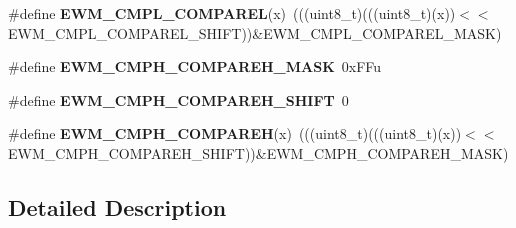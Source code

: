 \begin{DoxyCompactItemize}
\item 
\#define {\bfseries E\+W\+M\+\_\+\+C\+M\+P\+L\+\_\+\+C\+O\+M\+P\+A\+R\+EL}(x)~(((uint8\+\_\+t)(((uint8\+\_\+t)(x))$<$$<$E\+W\+M\+\_\+\+C\+M\+P\+L\+\_\+\+C\+O\+M\+P\+A\+R\+E\+L\+\_\+\+S\+H\+I\+FT))\&E\+W\+M\+\_\+\+C\+M\+P\+L\+\_\+\+C\+O\+M\+P\+A\+R\+E\+L\+\_\+\+M\+A\+SK)\hypertarget{group__EWM__Register__Masks_gab21f922dd31c0389d2431b0bad15c34a}{}\label{group__EWM__Register__Masks_gab21f922dd31c0389d2431b0bad15c34a}

\item 
\#define {\bfseries E\+W\+M\+\_\+\+C\+M\+P\+H\+\_\+\+C\+O\+M\+P\+A\+R\+E\+H\+\_\+\+M\+A\+SK}~0x\+F\+Fu\hypertarget{group__EWM__Register__Masks_ga2bba159a8c0eaace911da192c1747c73}{}\label{group__EWM__Register__Masks_ga2bba159a8c0eaace911da192c1747c73}

\item 
\#define {\bfseries E\+W\+M\+\_\+\+C\+M\+P\+H\+\_\+\+C\+O\+M\+P\+A\+R\+E\+H\+\_\+\+S\+H\+I\+FT}~0\hypertarget{group__EWM__Register__Masks_ga02d5e37ee2e38be4d3654c4eb0854cb5}{}\label{group__EWM__Register__Masks_ga02d5e37ee2e38be4d3654c4eb0854cb5}

\item 
\#define {\bfseries E\+W\+M\+\_\+\+C\+M\+P\+H\+\_\+\+C\+O\+M\+P\+A\+R\+EH}(x)~(((uint8\+\_\+t)(((uint8\+\_\+t)(x))$<$$<$E\+W\+M\+\_\+\+C\+M\+P\+H\+\_\+\+C\+O\+M\+P\+A\+R\+E\+H\+\_\+\+S\+H\+I\+FT))\&E\+W\+M\+\_\+\+C\+M\+P\+H\+\_\+\+C\+O\+M\+P\+A\+R\+E\+H\+\_\+\+M\+A\+SK)\hypertarget{group__EWM__Register__Masks_gae012c25873f36888e3d0302060c97be5}{}\label{group__EWM__Register__Masks_gae012c25873f36888e3d0302060c97be5}

\end{DoxyCompactItemize}


\subsection{Detailed Description}
